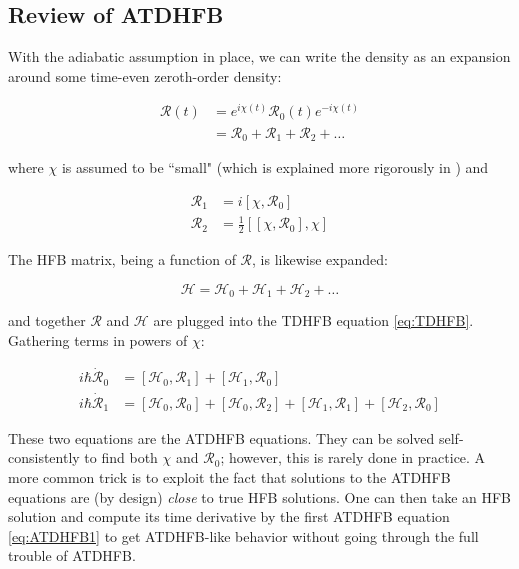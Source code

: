 \subsection{Review of ATDHFB}

With the adiabatic assumption in place, we can write the density as an expansion around some time-even zeroth-order density:

\begin{align}
\mathcal{R}(t) 
&= e^{i\chi(t)}\mathcal{R}_0(t)e^{-i\chi(t)} \\
&= \mathcal{R}_0 + \mathcal{R}_1 + \mathcal{R}_2 + \dots
\end{align}

\noindent where $\chi$ is assumed to be ``small" (which is explained more rigorously in \cite{Baranger1978}) and

\begin{align}\label{eqn:densities1}
\mathcal{R}_1 &= i\left[\chi, \mathcal{R}_0\right] \\
\label{eqn:densities2}\mathcal{R}_2 &= \frac{1}{2}\left[\left[\chi, \mathcal{R}_0\right], \chi\right] 
\end{align}

\noindent The HFB matrix, being a function of $\mathcal{R}$, is likewise expanded:

\begin{equation}
\mathcal{H} = \mathcal{H}_0 + \mathcal{H}_1 + \mathcal{H}_2 + \dots
\end{equation}

\noindent and together $\mathcal{R}$ and $\mathcal{H}$ are plugged into the TDHFB equation \ref{eq:TDHFB}. Gathering terms in powers of $\chi$:

\begin{align}
i\hbar\mathcal{\dot{R}}_0 &= \left[\mathcal{H}_0, \mathcal{R}_1\right] + \left[\mathcal{H}_1, \mathcal{R}_0\right] \label{eq:ATDHFB1}\\
i\hbar\mathcal{\dot{R}}_1 &= \left[\mathcal{H}_0, \mathcal{R}_0\right] + \left[\mathcal{H}_0, \mathcal{R}_2\right]
+ \left[\mathcal{H}_1, \mathcal{R}_1\right] + \left[\mathcal{H}_2, \mathcal{R}_0\right]
\end{align}

\noindent These two equations are the ATDHFB equations. They can be solved self-consistently to find both $\chi$ and $\mathcal{R}_0$; however, this is rarely done in practice. A more common trick is to exploit the fact that solutions to the ATDHFB equations are (by design) \textit{close} to true HFB solutions. One can then take an HFB solution and compute its time derivative by the first ATDHFB equation \ref{eq:ATDHFB1} to get ATDHFB-like behavior without going through the full trouble of ATDHFB.

